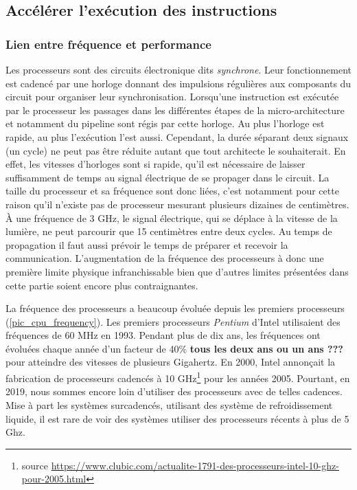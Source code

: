 \subsection{Accélérer l'exécution des instructions} \label{sec:accelerer}


\subsubsection{Lien entre fréquence et performance}
Les processeurs sont des circuits électronique dits \textit{synchrone}. Leur fonctionnement est cadencé par une horloge donnant des impulsions régulières aux composants du circuit pour organiser leur synchronisation. Lorsqu'une instruction est exécutée par le processeur les passages dans les différentes étapes de la micro-architecture et notamment du pipeline sont régis par cette horloge. Au plus l'horloge est rapide, au plus l'exécution l'est aussi. Cependant, la durée séparant deux signaux (un cycle) ne peut pas être réduite autant que tout architecte le souhaiterait. En effet, les vitesses d'horloges sont si rapide, qu'il est nécessaire de laisser suffisamment de temps au signal électrique de se propager dans le circuit. La taille du processeur et sa fréquence sont donc liées, c'est notamment pour cette raison qu'il n'existe pas de processeur mesurant plusieurs dizaines de centimètres. À une fréquence de 3 GHz, le signal électrique, qui se déplace à la vitesse de la lumière, ne peut parcourir que 15 centimètres entre deux cycles. Au temps de propagation il faut aussi prévoir le temps de préparer et recevoir la communication. L'augmentation de la fréquence des processeurs à donc une première limite physique infranchissable bien que d'autres limites présentées dans cette partie soient encore plus contraignantes.

La fréquence des processeurs a beaucoup évoluée depuis les premiers processeurs (\autoref{pic_cpu_frequency}). Les premiers processeurs \textit{Pentium} d'Intel utilisaient des fréquences de 60 MHz en 1993. Pendant plus de dix ans, les fréquences ont évoluées chaque année d'un facteur de 40\%  \textbf{tous les deux ans ou un ans ???}pour atteindre des vitesses de plusieurs Gigahertz. En 2000, Intel annonçait la fabrication de processeurs cadencés à 10 GHz\footnote{source \url{https://www.clubic.com/actualite-1791-des-processeurs-intel-10-ghz-pour-2005.html}} pour les années 2005. Pourtant, en 2019, nous sommes encore loin d’utiliser des processeurs avec de telles cadences. Mise à part les systèmes surcadencés, utilisant des système de refroidissement liquide, il est rare de voir des systèmes utiliser des processeurs récents à plus de 5 Ghz.

